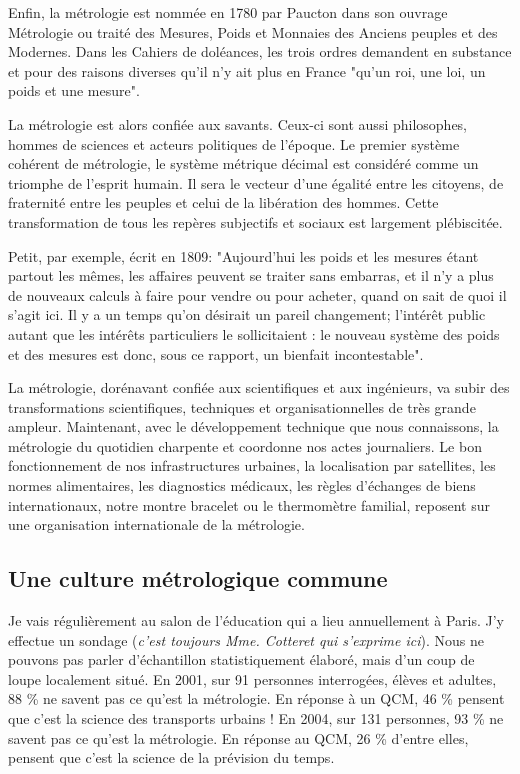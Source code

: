 \documentclass[main.tex]{subfiles}
\begin{document}
Enfin, la métrologie est nommée en 1780 par Paucton dans son ouvrage Métrologie ou traité des Mesures, Poids et Monnaies des Anciens peuples et des Modernes.  Dans les Cahiers de doléances, les trois ordres demandent en substance et pour des raisons diverses qu'il n'y ait plus en France "qu'un roi, une loi, un poids et une mesure".

La métrologie est alors confiée aux savants. Ceux-ci sont aussi philosophes, hommes de sciences et acteurs politiques de l'époque.  Le premier système cohérent de métrologie, le système métrique décimal est considéré comme un triomphe de l'esprit humain.  Il sera le vecteur d'une égalité entre les citoyens, de fraternité entre les peuples et celui de la libération des hommes.  Cette transformation de tous les repères subjectifs et sociaux est largement plébiscitée.

Petit, par exemple, écrit en 1809: "Aujourd'hui les poids et les mesures étant partout les mêmes, les affaires peuvent se traiter sans embarras, et il n'y a plus de nouveaux calculs à faire pour vendre ou pour acheter, quand on sait de quoi il s'agit ici. Il y a un temps qu'on désirait un pareil changement; l'intérêt public autant que les intérêts particuliers le sollicitaient : le nouveau système des poids et des mesures est donc, sous ce rapport, un bienfait incontestable".

La métrologie, dorénavant confiée aux scientifiques et aux ingénieurs, va subir des transformations scientifiques, techniques et organisationnelles de très grande ampleur. Maintenant, avec le développement technique que nous connaissons, la métrologie du quotidien charpente et coordonne nos actes journaliers.  Le bon fonctionnement de nos infrastructures urbaines, la localisation par satellites, les normes alimentaires, les diagnostics médicaux, les règles d'échanges de biens internationaux, notre montre bracelet ou le thermomètre familial, reposent sur une organisation internationale de la métrologie.

\subsection{Une culture métrologique commune}

Je vais régulièrement au salon de l'éducation qui a lieu annuellement à Paris. J'y effectue un sondage (\textit{c'est toujours Mme. Cotteret qui s'exprime ici}). Nous ne pouvons pas parler d'échantillon statistiquement élaboré, mais d'un coup de loupe localement situé.  En 2001, sur 91 personnes interrogées, élèves et adultes, 88 \% ne savent pas ce qu'est la métrologie.  En réponse à un QCM, 46 \% pensent que c'est la science des transports urbains ! En 2004, sur 131 personnes, 93 \% ne savent pas ce qu'est la métrologie. En réponse au QCM, 26 \% d'entre elles, pensent que c'est la science de la prévision du temps.
\end{document}
